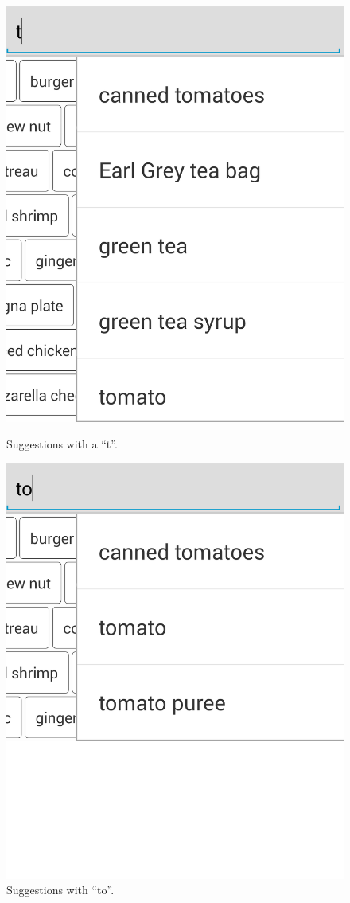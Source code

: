 \begin{figure}[H]
\begin{minipage}[b]{0.5\columnwidth}
\centering
\includegraphics[width=0.7\columnwidth]{img/screenshots/searchSuggestion1.png}
\caption{Suggestions with a ``t''\label{fig:suggestt}.}
\end{minipage}
\hspace{0.5cm}
\begin{minipage}[b]{0.5\columnwidth}
\centering
\includegraphics[width=0.7\columnwidth]{img/screenshots/searchSuggestion2.png}
\caption{Suggestions with ``to''\label{fig:suggestto}.}
\end{minipage}
\end{figure}

